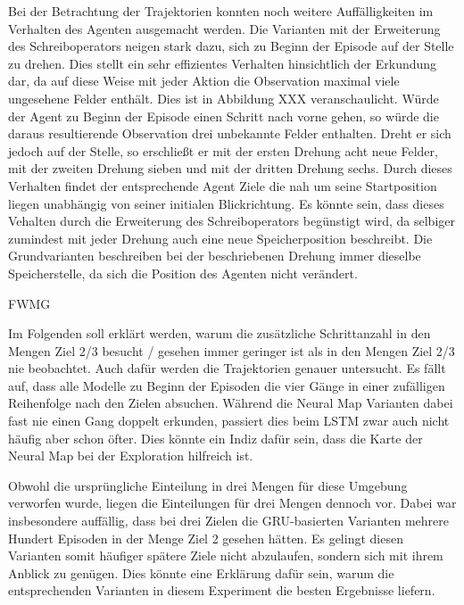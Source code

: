 Bei der Betrachtung der Trajektorien konnten noch weitere Auffälligkeiten im Verhalten des Agenten ausgemacht werden. Die Varianten mit der Erweiterung des Schreiboperators neigen stark dazu, sich zu Beginn der Episode auf der Stelle zu drehen. Dies stellt ein sehr effizientes Verhalten hinsichtlich der Erkundung dar, da auf diese Weise mit jeder Aktion die Observation maximal viele ungesehene Felder enthält. Dies ist in Abbildung XXX veranschaulicht. Würde der Agent zu Beginn der Episode einen Schritt nach vorne gehen, so würde die daraus resultierende Observation drei unbekannte Felder enthalten. Dreht er sich jedoch auf der Stelle, so erschließt er mit der ersten Drehung acht neue Felder, mit der zweiten Drehung sieben und mit der dritten Drehung sechs. Durch dieses Verhalten findet der entsprechende Agent Ziele die nah um seine Startposition liegen unabhängig von seiner initialen Blickrichtung. Es könnte sein, dass dieses Vehalten durch die Erweiterung des Schreiboperators begünstigt wird, da selbiger zumindest mit jeder Drehung auch eine neue Speicherposition beschreibt. Die Grundvarianten beschreiben bei der beschriebenen Drehung immer dieselbe Speicherstelle, da sich die Position des Agenten nicht verändert.



FWMG

Im Folgenden soll erklärt werden, warum die zusätzliche Schrittanzahl in den Mengen \glqq Ziel 2/3 besucht / gesehen\grqq{} immer geringer ist als in den Mengen \glqq Ziel 2/3 nie beobachtet\grqq{}. Auch dafür werden die Trajektorien genauer untersucht. Es fällt auf, dass alle Modelle zu Beginn der Episoden die vier Gänge in einer zufälligen Reihenfolge nach den Zielen absuchen. Während die Neural Map Varianten dabei fast nie einen Gang doppelt erkunden, passiert dies beim LSTM zwar auch nicht häufig aber schon öfter. Dies könnte ein Indiz dafür sein, dass die Karte der Neural Map bei der Exploration hilfreich ist.



Obwohl die ursprüngliche Einteilung in drei Mengen für diese Umgebung verworfen wurde, liegen die Einteilungen für drei Mengen dennoch vor. Dabei war insbesondere auffällig, dass bei drei Zielen die GRU-basierten Varianten mehrere Hundert Episoden in der Menge \glqq Ziel 2 gesehen\grqq{} hätten. Es gelingt diesen Varianten somit häufiger spätere Ziele nicht abzulaufen, sondern sich mit ihrem Anblick zu genügen. Dies könnte eine Erklärung dafür sein, warum die entsprechenden Varianten in diesem Experiment die besten Ergebnisse liefern.



